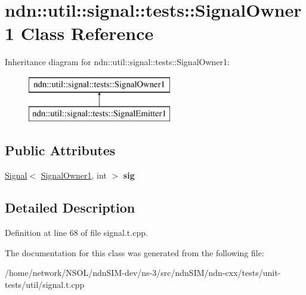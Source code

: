 \hypertarget{classndn_1_1util_1_1signal_1_1tests_1_1SignalOwner1}{}\section{ndn\+:\+:util\+:\+:signal\+:\+:tests\+:\+:Signal\+Owner1 Class Reference}
\label{classndn_1_1util_1_1signal_1_1tests_1_1SignalOwner1}
Inheritance diagram for ndn\+:\+:util\+:\+:signal\+:\+:tests\+:\+:Signal\+Owner1\+:\begin{figure}[H]
\begin{center}
\leavevmode
\includegraphics[height=2.000000cm]{classndn_1_1util_1_1signal_1_1tests_1_1SignalOwner1}
\end{center}
\end{figure}
\subsection*{Public Attributes}
\begin{DoxyCompactItemize}
\item 
\hyperlink{classndn_1_1util_1_1signal_1_1Signal}{Signal}$<$ \hyperlink{classndn_1_1util_1_1signal_1_1tests_1_1SignalOwner1}{Signal\+Owner1}, int $>$ {\bfseries sig}\hypertarget{classndn_1_1util_1_1signal_1_1tests_1_1SignalOwner1_a35967aad14b1d36d450ffc11b839c01e}{}\label{classndn_1_1util_1_1signal_1_1tests_1_1SignalOwner1_a35967aad14b1d36d450ffc11b839c01e}

\end{DoxyCompactItemize}


\subsection{Detailed Description}


Definition at line 68 of file signal.\+t.\+cpp.



The documentation for this class was generated from the following file\+:\begin{DoxyCompactItemize}
\item 
/home/network/\+N\+S\+O\+L/ndn\+S\+I\+M-\/dev/ns-\/3/src/ndn\+S\+I\+M/ndn-\/cxx/tests/unit-\/tests/util/signal.\+t.\+cpp\end{DoxyCompactItemize}
